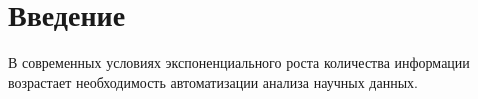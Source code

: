 
\section*{Введение}

В современных условиях экспоненциального роста количества информации возрастает необходимость автоматизации анализа научных данных.

